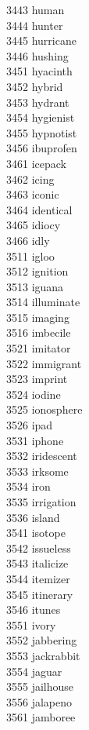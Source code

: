 3443 human \\
3444 hunter \\
3445 hurricane \\
3446 hushing \\
3451 hyacinth \\
3452 hybrid \\
3453 hydrant \\
3454 hygienist \\
3455 hypnotist \\
3456 ibuprofen \\
3461 icepack \\
3462 icing \\
3463 iconic \\
3464 identical \\
3465 idiocy \\
3466 idly \\
3511 igloo \\
3512 ignition \\
3513 iguana \\
3514 illuminate \\
3515 imaging \\
3516 imbecile \\
3521 imitator \\
3522 immigrant \\
3523 imprint \\
3524 iodine \\
3525 ionosphere \\
3526 ipad \\
3531 iphone \\
3532 iridescent \\
3533 irksome \\
3534 iron \\
3535 irrigation \\
3536 island \\
3541 isotope \\
3542 issueless \\
3543 italicize \\
3544 itemizer \\
3545 itinerary \\
3546 itunes \\
3551 ivory \\
3552 jabbering \\
3553 jackrabbit \\
3554 jaguar \\
3555 jailhouse \\
3556 jalapeno \\
3561 jamboree \\
